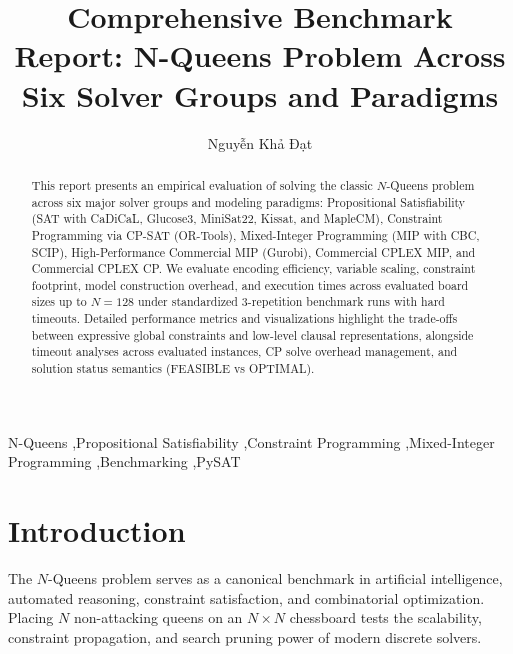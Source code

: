 \documentclass[a4paper,fleqn]{cas-sc}
\begin{document}
\title{\textbf{Comprehensive Benchmark Report: N-Queens Problem Across Six Solver Groups and Paradigms}}
\author[1]{Nguyễn Khả Đạt}


\begin{abstract}
This report presents an empirical evaluation of solving the classic $N$-Queens problem across six major solver groups and modeling paradigms: Propositional Satisfiability (SAT with CaDiCaL, Glucose3, MiniSat22, Kissat, and MapleCM), Constraint Programming via CP-SAT (OR-Tools), Mixed-Integer Programming (MIP with CBC, SCIP), High-Performance Commercial MIP (Gurobi), Commercial CPLEX MIP, and Commercial CPLEX CP. We evaluate encoding efficiency, variable scaling, constraint footprint, model construction overhead, and execution times across evaluated board sizes up to $N = 128$ under standardized 3-repetition benchmark runs with hard timeouts. Detailed performance metrics and visualizations highlight the trade-offs between expressive global constraints and low-level clausal representations, alongside timeout analyses across evaluated instances, CP solve overhead management, and solution status semantics (FEASIBLE vs OPTIMAL).
\end{abstract}

\begin{keywords}
N-Queens \sep Propositional Satisfiability \sep Constraint Programming \sep Mixed-Integer Programming \sep Benchmarking \sep PySAT
\end{keywords}

\maketitle
{}

\section{Introduction}
The $N$-Queens problem serves as a canonical benchmark in artificial intelligence, automated reasoning, constraint satisfaction, and combinatorial optimization. Placing $N$ non-attacking queens on an $N \times N$ chessboard tests the scalability, constraint propagation, and search pruning power of modern discrete solvers. 
\end{document}
